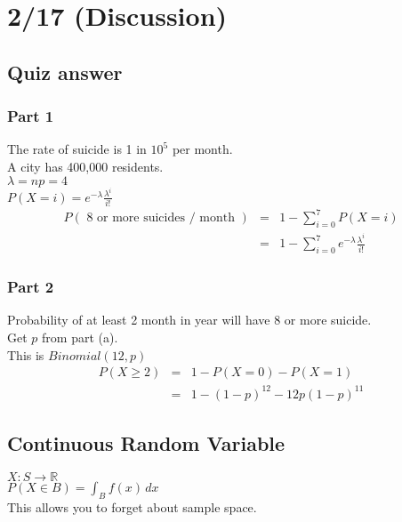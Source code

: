 \section*{2/17 (Discussion)}
  \subsection*{Quiz answer}
    \subsubsection*{Part 1}
    The rate of suicide is 1 in $10^5$ per month.\\
    A city has 400,000 residents.\\
    $\lambda = np = 4$\\
    $P(X = i) = e^{-\lambda} \frac{\lambda^i}{i!}$\\
    \begin{eqnarray*}
    P(\text{ 8 or more suicides / month }) & = & 1 - \sum_{i = 0}^7 P(X = i)\\
      & = & 1 - \sum_{i = 0}^7 e^{-\lambda}\frac{\lambda^i}{i!}
    \end{eqnarray*}
    \subsubsection*{Part 2}
      Probability of at least 2 month in year will have 8 or more suicide.\\
      Get $p$ from part (a).\\
      This is $Binomial(12,p)$\\
      \begin{eqnarray*}
        P(X \ge 2) & = & 1 - P(X = 0) - P(X = 1)\\
        & = & 1 - (1 - p)^{12} - 12p(1-p)^{11}
      \end{eqnarray*}

  \subsection*{Continuous Random Variable}
    $X: S \to \mathbb{R}$\\
    $P(X \in B) = \int_B f(x)\,dx$\\
    This allows you to forget about sample space.

